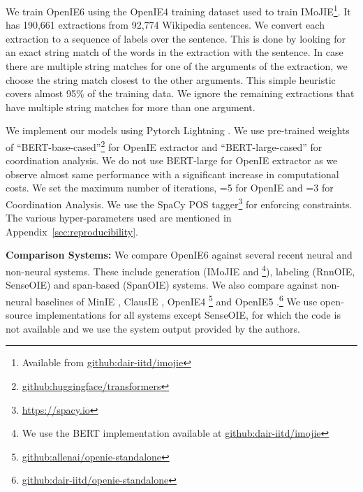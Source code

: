 \documentclass[11pt,a4paper]{article}
\makeatletter
\newcommand\footnoteref[1]{\protected@xdef\@thefnmark{\ref{#1}}\@footnotemark}
\makeatother
\begin{document}
We train OpenIE6 using the OpenIE4 training dataset used to train IMoJIE\footnote{Available from \href{https://github.com/dair-iitd/imojie}{github:dair-iitd/imojie}}. It has 190,661 extractions from 92,774 Wikipedia sentences.
We convert each extraction to a sequence of labels over the sentence. This is done by looking for an exact string match of the words in the extraction with the sentence. In case there are multiple string matches for one of the arguments of the extraction, we choose the string match closest to the other arguments. This simple heuristic covers almost 95\% of the training data. We ignore the remaining extractions that have multiple string matches for more than one argument.

We implement our models using Pytorch Lightning \cite{falcon&19}. We 
use pre-trained weights of ``BERT-base-cased''\footnote{\label{footnote:huggingface}\href{https://github.com/huggingface/transformers}{github:huggingface/transformers}} for OpenIE extractor and ``BERT-large-cased''\footnoteref{footnote:huggingface} for coordination analysis.
We do not use BERT-large for OpenIE extractor as we observe almost same performance with a significant increase in computational costs.
We set the maximum number of iterations, =5 for OpenIE and =3 for Coordination Analysis. We use the SpaCy POS tagger\footnote{\href{https://spacy.io}{https://spacy.io}} for enforcing constraints. The various hyper-parameters used are mentioned in Appendix~\ref{sec:reproducibility}.













\vspace{0.5ex}
\noindent
{\bf Comparison Systems:}  We compare OpenIE6 against several recent neural and non-neural systems. These include generation (IMoJIE and \citet{cui+18}\footnote{We use the BERT implementation available at \href{https://github.com/dair-iitd/imojie}{github:dair-iitd/imojie}}), labeling (RnnOIE, SenseOIE) and span-based (SpanOIE) systems.
We also compare against non-neural baselines of MinIE \cite{gashteovski&al17},
ClausIE \cite{corro&al13},
OpenIE4 \cite{christensen&al11}\footnote{\href{https://github.com/allenai/openie-standalone}{github:allenai/openie-standalone}} and OpenIE5 \cite{saha&al2017, saha&mausam18}.\footnote{\href{https://github.com/dair-iitd/OpenIE-standalone}{github:dair-iitd/openie-standalone}}  We use open-source implementations for all systems except SenseOIE, for which the code is not available and we use the system output provided by the authors.
\end{document}
